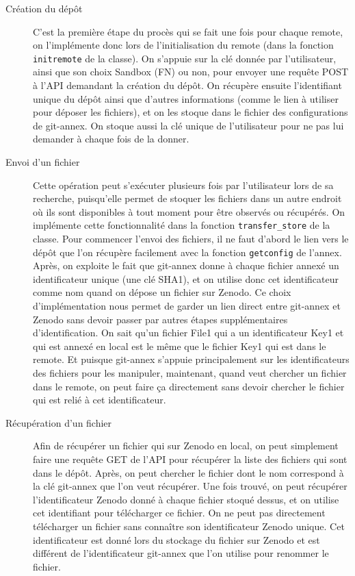 \documentclass[11pt]{article}
\begin{document}
\begin{description}
\item[{Création du dépôt}] C'est la première étape du procès qui se fait une fois pour chaque
remote, on l'implémente donc lors de l'initialisation du remote
(dans la fonction \texttt{initremote} de la classe). On s'appuie sur la clé
donnée par l'utilisateur, ainsi que son choix Sandbox (FN) ou non,
pour envoyer une requête POST à l'API demandant la création du
dépôt. On récupère ensuite l'identifiant unique du dépôt ainsi que
d'autres informations (comme le lien à utiliser pour déposer les
fichiers), et on les stoque dans le fichier des configurations de
git-annex. On stoque aussi la clé unique de l'utilisateur pour ne
pas lui demander à chaque fois de la donner.

\item[{Envoi d'un fichier}] Cette opération peut s'exécuter plusieurs fois par l'utilisateur
lors de sa recherche, puisqu'elle permet de stoquer les fichiers
dans un autre endroit où ils sont disponibles à tout moment pour
être observés ou récupérés. On implémente cette fonctionnalité dans
la fonction \texttt{transfer\_store} de la classe.
Pour commencer l'envoi des fichiers, il ne faut d'abord le lien vers
le dépôt que l'on récupère facilement avec la fonction \texttt{getconfig} de
l'annex. Après, on exploite le fait que git-annex donne à chaque
fichier annexé un identificateur unique (une clé SHA1), et on
utilise donc cet identificateur comme nom quand on dépose un fichier
sur Zenodo. Ce choix d'implémentation nous permet de garder un lien
direct entre git-annex et Zenodo sans devoir passer par autres
étapes supplémentaires d'identification. On sait qu'un fichier File1
qui a un identificateur Key1 et qui est annexé en local est le même
que le fichier Key1 qui est dans le remote. Et puisque git-annex
s'appuie principalement sur les identificateurs des fichiers pour
les manipuler, maintenant, quand veut chercher un fichier dans le
remote, on peut faire ça directement sans devoir chercher le fichier
qui est relié à cet identificateur.

\item[{Récupération d'un fichier}] Afin de récupérer un fichier qui sur Zenodo en local, on peut
simplement faire une requête GET de l'API pour récupérer la liste
des fichiers qui sont dans le dépôt. Après, on peut chercher le
fichier dont le nom correspond à la clé git-annex que l'on veut
récupérer. Une fois trouvé, on peut récupérer l'identificateur
Zenodo donné à chaque fichier stoqué dessus, et on utilise cet
identifiant pour télécharger ce fichier.
On ne peut pas directement télécharger un fichier sans connaître son
identificateur Zenodo unique. Cet identificateur est donné lors du
stockage du fichier sur Zenodo et est différent de l'identificateur
git-annex que l'on utilise pour renommer le fichier.


\end{description}
\end{document}
